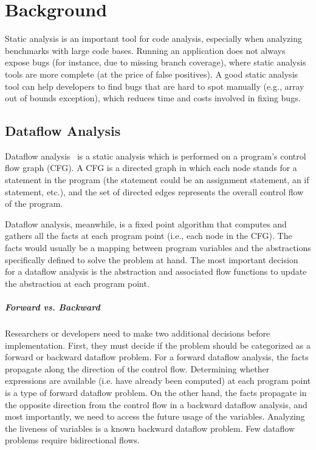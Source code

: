 \chapter{Background}
\label{chap:background}

Static analysis is an important tool for code analysis, especially when analyzing benchmarks with large code bases. Running an application does not always expose bugs (for instance, due to missing branch coverage), where static analysis tools are more complete (at the price of false positives). A good static analysis tool can help developers to find bugs that are hard to spot manually (e.g., array out of bounds exception), which reduces time and costs involved in fixing bugs. 

\section{Dataflow Analysis}

Dataflow analysis~\cite{kildall73:_unified_approac_global_progr_optim} is a static analysis which is performed on a program's control flow graph (CFG). A CFG is a directed graph in which each node stands for a statement in the program (the statement could be an assignment statement, an if statement, etc.), and the set of directed edges represents the overall control flow of the program.

Dataflow analysis, meanwhile, is a fixed point algorithm that computes and gathers all the facts at each program point (i.e., each node in the CFG). The facts would usually be a mapping between program variables and the abstractions specifically defined to solve the problem at hand. The most important decision for a dataflow analysis is the abstraction and associated flow functions to update the abstraction at each program point.

\paragraph{Forward vs. Backward} Researchers or developers need to make two additional decisions before implementation. First, they must decide if the problem should be categorized as a forward or backward dataflow problem. For a forward dataflow analysis, the facts propagate along the direction of the control flow. Determining whether expressions are available (i.e. have already been computed) at each program point is a type of forward dataflow problem. On the other hand, the facts propagate in the opposite direction from the control flow in a backward dataflow analysis, and most importantly, we need to access the future usage of the variables. Analyzing the liveness of variables is a known backward dataflow problem. Few dataflow problems require bidirectional flows.

